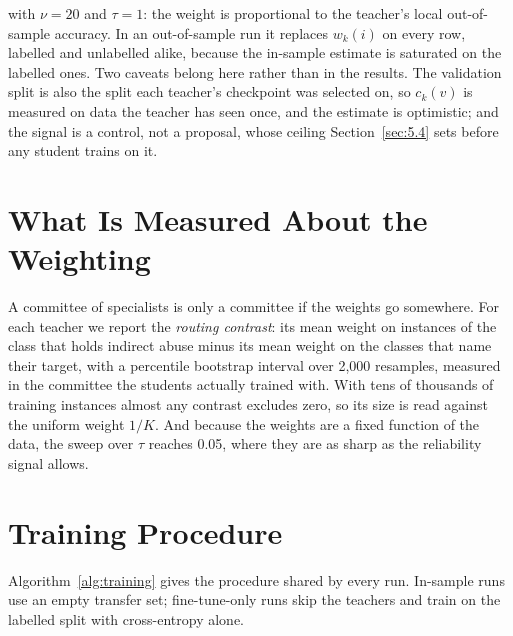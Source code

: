 with $\nu = 20$ and $\tau = 1$: the weight is proportional to the teacher's local out-of-sample
accuracy. In an out-of-sample run it replaces $w_k(i)$ on every row, labelled and unlabelled alike,
because the in-sample estimate is saturated on the labelled ones. Two caveats belong here rather
than in the results. The validation split is also the split each teacher's checkpoint was selected
on, so $c_k(v)$ is measured on data the teacher has seen once, and the estimate is optimistic; and
the signal is a control, not a proposal, whose ceiling Section~\ref{sec:5.4} sets before any student
trains on it.
\section{What Is Measured About the Weighting}
\label{sec:3.6}
A committee of specialists is only a committee if the weights go somewhere. For each teacher we
report the \emph{routing contrast}: its mean weight on instances of the class that holds indirect
abuse minus its mean weight on the classes that name their target, with a percentile bootstrap
interval over 2,000 resamples, measured in the committee the students actually trained with. With
tens of thousands of training instances almost any contrast excludes zero, so its size is read
against the uniform weight $1/K$. And because the weights are a fixed function of the data, the
sweep over $\tau$ reaches 0.05, where they are as sharp as the reliability signal allows.

\section{Training Procedure}
\label{sec:3.7}
Algorithm~\ref{alg:training} gives the procedure shared by every run. In-sample runs use an empty
transfer set; fine-tune-only runs skip the teachers and train on the labelled split with cross-entropy
alone.

